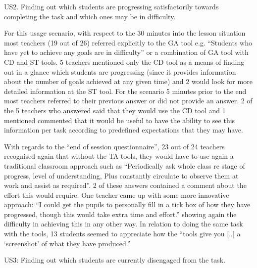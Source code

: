 US2. Finding out which students are progressing satisfactorily towards completing the task and which ones may be in difficulty.
 
For this usage scenario, with respect to the 30 minutes into the
lesson situation most teachers (19 out of 26) referred explicitly to
the GA tool e.g. “Students who have yet to achieve any goals are in
difficulty” or a combination of GA tool with CD and ST tools. 5
teachers mentioned only the CD tool as a means of finding out in a
glance which students are progressing (since it provides information
about the number of goals achieved at any given time) and 2 would look
for more detailed information at the ST tool. For the scenario 5
minutes prior to the end most teachers referred to their previous
answer or did not provide an answer. 2 of the 5 teachers who answered
said that they would use the CD tool and 1 mentioned commented that it
would be useful to have the ability to see this information per task
according to predefined expectations that they may have. 
 
With regards to the “end of session questionnaire”, 23 out of 24
teachers recognised again that without the TA tools, they would have
to use again a traditional classroom approach such as “Periodically
ask whole class re stage of progress, level of understanding, Plus
constantly circulate to observe them at work and assist as
required”. 2 of these answers contained a comment about the effort
this would require. One teacher came up with some more innovative
approach: “I could get the pupils to personally fill in a tick box of
how they have progressed, though this would take extra time and
effort.” showing again the difficulty in achieving this in any other
way. In relation to doing the same task with the tools, 13 students
seemed to appreciate how the “tools give you [..] a ‘screenshot’ of
what they have produced.”

US3: Finding out which students are currently disengaged from the task.

